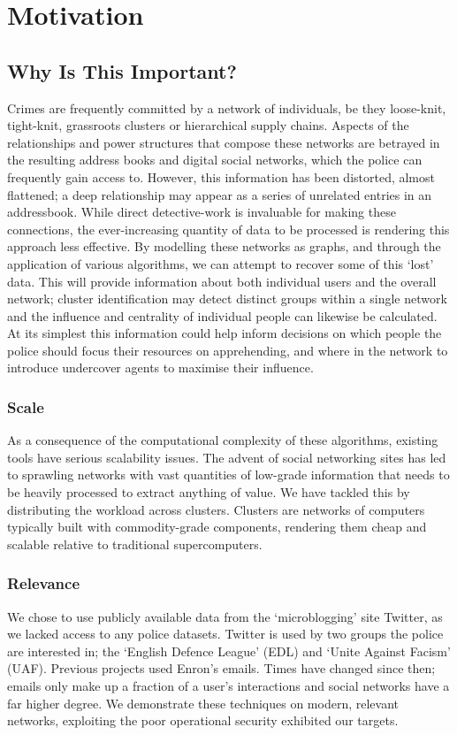 \chapter{Motivation}

\section{Why Is This Important?}
Crimes are frequently committed by a network of individuals, be they loose-knit,
tight-knit, grassroots clusters or hierarchical supply chains. Aspects of the
relationships and power structures that compose these networks are betrayed in
the resulting address books and digital social networks, which the police can
frequently gain access to. However, this information has been distorted, almost
flattened; a deep relationship may appear as a series of unrelated entries in an
addressbook. While direct detective-work is invaluable for making these
connections, the ever-increasing quantity of data to be processed is rendering
this approach less effective. By modelling these networks as graphs, and
through the application of various algorithms, we can attempt to recover some of
this `lost' data. This will provide information about both individual users and
the overall network; cluster identification may detect distinct groups within a
single network and the influence and centrality of individual people can
likewise be calculated. At its simplest this information could help inform
decisions on which people the police should focus their resources on
apprehending, and where in the network to introduce undercover agents to
maximise their influence. 

\subsection{Scale}
As a consequence of the computational complexity of these algorithms, existing tools have
serious scalability issues. The advent of social networking sites has led to
sprawling networks with vast quantities of low-grade information that needs to
be heavily processed to extract anything of value. We have tackled this by
distributing the workload across clusters. Clusters are networks of computers
typically built with commodity-grade components, rendering them cheap and
scalable relative to traditional supercomputers.

\subsection{Relevance}
We chose to use publicly available data from the `microblogging' site Twitter, 
as we lacked access to any police datasets. Twitter is used by two groups the police
are interested in; the `English Defence League' (EDL) and `Unite Against Facism'
(UAF). Previous projects used Enron's emails. Times have changed since then;
emails only make up a fraction of a user's interactions and social networks have
a far higher degree. We demonstrate these techniques on modern, relevant
networks, exploiting the poor operational security exhibited our targets.


